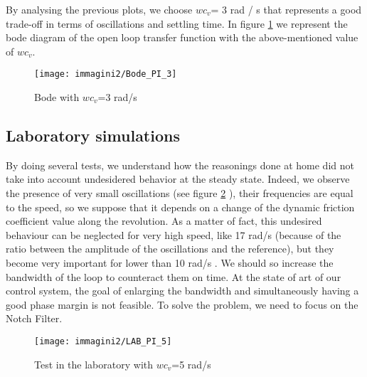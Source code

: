 \par By analysing the previous plots, we choose $wc_{v}$= 3 rad / s that represents a good trade-off in terms of oscillations and settling time. In figure \ref{fig:Bode with $wc_{v}$=3 rad/s} we represent the bode diagram of the open loop transfer function with the above-mentioned value of $wc_{v}$.

\begin{figure}[h]
	\centering
	\texttt{[image: immagini2/Bode\_PI\_3]}
	\caption{Bode with $wc_{v}$=3 rad/s}
	\label{fig:Bode with $wc_{v}$=3 rad/s}
\end{figure}

\subsection{Laboratory simulations}
By doing several tests, we understand how the reasonings done at home did not take into account undesidered behavior at the steady state. Indeed, we observe the presence of very small oscillations (see figure \ref{fig:LAB_PI_5} ), their frequencies are equal to the speed, so we suppose that it depends on a change of the dynamic friction coefficient value along the revolution. As a matter of fact, this undesired behaviour can be neglected for very high speed, like 17 rad/s (because of the ratio between the amplitude of the oscillations and the reference), but they become very important for lower than 10 rad/s .  We should so increase the bandwidth of the loop to counteract them on time.  At the state of art of our control system, the goal of enlarging the bandwidth and simultaneously having a good phase margin is not feasible. To solve the problem, we need to focus on the Notch Filter. 

\begin{figure}[h]
	\centering
	\texttt{[image: immagini2/LAB\_PI\_5]}
	\caption{Test in the laboratory with $wc_{v}$=5 rad/s}
	\label{fig:LAB_PI_5}
\end{figure}

